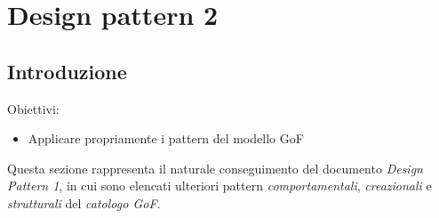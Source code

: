 \documentclass{article}
\begin{document}
\pagestyle{empty}
\section*{Design pattern 2}
\large

\subsection*{Introduzione}
\large
Obiettivi:
\begin{itemize}
    \renewcommand{\labelitemi}{-}
    \itemsep0em
    \item Applicare propriamente i pattern del modello GoF 
\end{itemize}
Questa sezione rappresenta il naturale conseguimento del documento \textit{Design Pattern 1}, in cui sono elencati ulteriori pattern \textit{comportamentali}, \textit{creazionali} e \textit{strutturali} del \textit{catologo GoF}.
\end{document}
